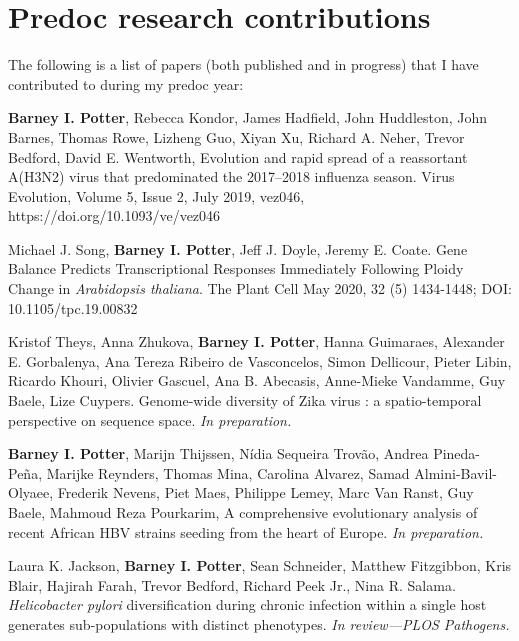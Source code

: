 \chapter{Predoc research contributions}
\label{ch:myappendix}

The following is a list of papers (both published and in progress) that I have contributed to during my predoc year:

\textbf{Barney I. Potter}, Rebecca Kondor, James Hadfield, John Huddleston, John Barnes, Thomas Rowe, Lizheng Guo, Xiyan Xu, Richard A. Neher, Trevor Bedford, David E. Wentworth, Evolution and rapid spread of a reassortant A(H3N2) virus that predominated the 2017–2018 influenza season. Virus Evolution, Volume 5, Issue 2, July 2019, vez046, https://doi.org/10.1093/ve/vez046

Michael J. Song, \textbf{Barney I. Potter}, Jeff J. Doyle, Jeremy E. Coate. Gene Balance Predicts Transcriptional Responses Immediately Following Ploidy Change in \textit{Arabidopsis thaliana}. The Plant Cell May 2020, 32 (5) 1434-1448; DOI: 10.1105/tpc.19.00832

Kristof Theys, Anna Zhukova, \textbf{Barney I. Potter}, Hanna Guimaraes, Alexander E. Gorbalenya, Ana Tereza Ribeiro de Vasconcelos, Simon Dellicour, Pieter Libin, Ricardo Khouri, Olivier Gascuel, Ana B. Abecasis, Anne-Mieke Vandamme, Guy Baele, Lize Cuypers. Genome-wide diversity of Zika virus : a spatio-temporal perspective on sequence space. \textit{In preparation.}

\textbf{Barney I. Potter}, Marijn Thijssen, N\'{i}dia Sequeira Trov\~{a}o,  Andrea Pineda-Pe\~{n}a, Marijke Reynders, Thomas Mina, Carolina Alvarez, Samad Almini-Bavil-Olyaee, Frederik Nevens, Piet Maes, Philippe Lemey, Marc Van Ranst, Guy Baele, Mahmoud Reza Pourkarim, A comprehensive evolutionary analysis of recent African HBV strains seeding from the heart of Europe. \textit{In preparation.}



Laura K. Jackson, \textbf{Barney I. Potter}, Sean Schneider, Matthew Fitzgibbon, Kris Blair, Hajirah Farah, Trevor Bedford, Richard Peek Jr., Nina R. Salama. \textit{Helicobacter pylori} diversification during chronic infection within a single host generates sub-populations with distinct phenotypes. \textit{In review---PLOS Pathogens.}


\cleardoublepage

